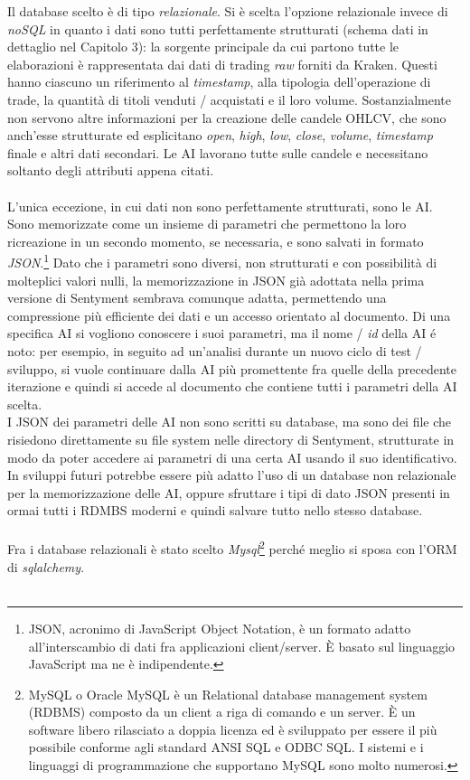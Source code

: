 \documentclass[a4paper,12pt]{report}
\begin{document}
Il database scelto è di tipo \textit{relazionale}. Si è scelta l'opzione relazionale invece di \textit{noSQL} in quanto i dati sono tutti perfettamente strutturati (schema dati in dettaglio nel Capitolo 3): la sorgente principale da cui partono tutte le elaborazioni è rappresentata dai dati di trading \textit{raw} forniti da Kraken. Questi hanno ciascuno un riferimento al \textit{timestamp}, alla tipologia dell'operazione di trade, la quantità di titoli venduti / acquistati e il loro volume. Sostanzialmente non servono altre informazioni per la creazione delle candele OHLCV, che sono anch'esse strutturate ed esplicitano \textit{open}, \textit{high}, \textit{low}, \textit{close}, \textit{volume}, \textit{timestamp} finale e altri dati secondari. Le AI lavorano tutte sulle candele e necessitano soltanto degli attributi appena citati.\\~\\
L'unica eccezione, in cui dati non sono perfettamente strutturati, sono le AI. Sono memorizzate come un insieme di parametri che permettono la loro ricreazione in un secondo momento, se necessaria, e sono salvati in formato \textit{JSON}.\footnote{JSON, acronimo di JavaScript Object Notation, è un formato adatto all'interscambio di dati fra applicazioni client/server. È basato sul linguaggio JavaScript ma ne è indipendente.} Dato che i parametri sono diversi, non strutturati e con possibilità di molteplici valori nulli, la memorizzazione in JSON già adottata nella prima versione di Sentyment sembrava comunque adatta, permettendo una compressione più efficiente dei dati e un accesso orientato al documento. Di una specifica AI si vogliono conoscere i suoi parametri, ma il nome / \textit{id} della AI é noto: per esempio, in seguito ad un'analisi durante un nuovo ciclo di test / sviluppo, si vuole continuare dalla AI più promettente fra quelle della precedente iterazione e quindi si accede al documento che contiene tutti i parametri della AI scelta.\\
I JSON dei parametri delle AI non sono scritti su database, ma sono dei file che risiedono direttamente su file system nelle directory di Sentyment, strutturate in modo da poter accedere ai parametri di una certa AI usando il suo identificativo. In sviluppi futuri potrebbe essere più adatto l'uso di un database non relazionale per la memorizzazione delle AI, oppure sfruttare i tipi di dato JSON presenti in ormai tutti i RDMBS moderni e quindi salvare tutto nello stesso database.\\~\\
Fra i database relazionali è stato scelto \textit{Mysql}\footnote{MySQL o Oracle MySQL è un Relational database management system (RDBMS) composto da un client a riga di comando e un server. È un software libero rilasciato a doppia licenza ed è sviluppato per essere il più possibile conforme agli standard ANSI SQL e ODBC SQL. I sistemi e i linguaggi di programmazione che supportano MySQL sono molto numerosi.} perché meglio si sposa con l'ORM di \textit{sqlalchemy}.\\~\\
\end{document}
